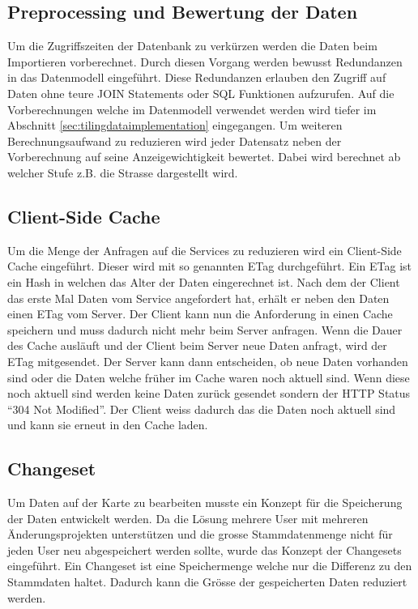 \subsection{Preprocessing und Bewertung der Daten}\label{sec:concept_preprocessing}
Um die Zugriffszeiten der Datenbank zu verkürzen werden die Daten beim Importieren vorberechnet. Durch diesen Vorgang werden bewusst Redundanzen in das Datenmodell eingeführt. Diese Redundanzen erlauben den Zugriff auf Daten ohne teure JOIN Statements oder SQL Funktionen aufzurufen. Auf die Vorberechnungen welche im Datenmodell verwendet werden wird tiefer im Abschnitt \ref{sec:tilingdataimplementation}  eingegangen. Um weiteren Berechnungsaufwand zu reduzieren wird jeder Datensatz neben der Vorberechnung auf seine Anzeigewichtigkeit bewertet. Dabei wird berechnet ab welcher Stufe z.B. die Strasse dargestellt wird.
\subsection{Client-Side Cache}
Um die Menge der Anfragen auf die Services zu reduzieren wird ein Client-Side Cache eingeführt. Dieser wird mit so genannten ETag durchgeführt. Ein ETag ist ein Hash in welchen das Alter der Daten eingerechnet ist. Nach dem der Client das erste Mal Daten vom Service angefordert hat, erhält er neben den Daten einen ETag vom Server. Der Client kann nun die Anforderung in einen Cache speichern und muss dadurch nicht mehr beim Server anfragen. Wenn die Dauer des Cache ausläuft und der Client beim Server neue Daten anfragt, wird der ETag mitgesendet. Der Server kann dann entscheiden, ob neue Daten vorhanden sind oder die Daten welche früher im Cache waren noch aktuell sind. Wenn diese noch aktuell sind werden keine Daten zurück gesendet sondern der HTTP Status "`304 Not Modified"'. Der Client weiss dadurch das die Daten noch aktuell sind und kann sie erneut in den Cache laden.
\subsection{Changeset}
Um Daten auf der Karte zu bearbeiten musste ein Konzept für die Speicherung der Daten entwickelt werden. Da die Lösung mehrere User mit mehreren Änderungsprojekten unterstützen und die grosse Stammdatenmenge nicht für jeden User neu abgespeichert werden sollte, wurde das Konzept der Changesets eingeführt. Ein Changeset ist eine Speichermenge welche nur die Differenz zu den Stammdaten haltet. Dadurch kann die Grösse der gespeicherten Daten reduziert werden.
